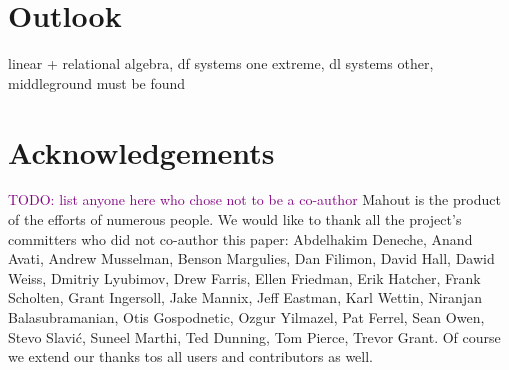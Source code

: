 \documentclass[twoside,11pt]{article}
\newcommand{\todo}[1]{\textcolor{purple}{TODO: #1}}
\begin{document}
\section{Outlook}

linear + relational algebra, df systems one extreme, dl systems other, middleground must be found

\section{Acknowledgements}
\todo{list anyone here who chose not to be a co-author} Mahout is the product of the efforts of numerous people. We would like to thank all the project's committers who did not co-author this paper: Abdelhakim Deneche, Anand Avati, Andrew Musselman, Benson Margulies, Dan Filimon, David Hall, Dawid Weiss, Dmitriy Lyubimov, Drew Farris, Ellen Friedman, Erik Hatcher, Frank Scholten, Grant Ingersoll, Jake Mannix, Jeff Eastman, Karl Wettin, Niranjan Balasubramanian, Otis Gospodnetic, Ozgur Yilmazel, Pat Ferrel,  Sean Owen, Stevo Slavić, Suneel Marthi, Ted Dunning, Tom Pierce, Trevor Grant. Of course we extend our thanks tos all users and contributors as well.

\vskip 0.2in

\end{document}
